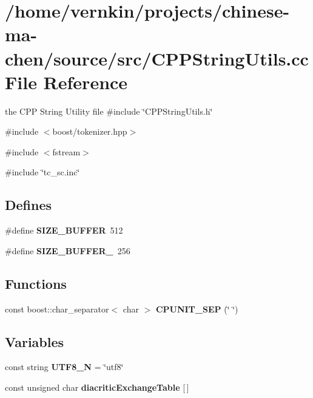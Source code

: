 \section{/home/vernkin/projects/chinese-\/ma-\/chen/source/src/CPPStringUtils.cc File Reference}
\label{CPPStringUtils_8cc}


the CPP String Utility file  
{\ttfamily \#include \char`\"{}CPPStringUtils.h\char`\"{}}\par
{\ttfamily \#include $<$boost/tokenizer.hpp$>$}\par
{\ttfamily \#include $<$fstream$>$}\par
{\ttfamily \#include \char`\"{}tc\_\-sc.inc\char`\"{}}\par
\subsection*{Defines}
\begin{DoxyCompactItemize}
\item 
\#define {\bfseries SIZE\_\-BUFFER}~512\label{CPPStringUtils_8cc_a4dea39042071768c1e115b0ebbfc52f2}

\item 
\#define {\bfseries SIZE\_\-BUFFER\_}~256\label{CPPStringUtils_8cc_aa4577a3eb0be47804f1ec7e20554d163}

\end{DoxyCompactItemize}
\subsection*{Functions}
\begin{DoxyCompactItemize}
\item 
const boost::char\_\-separator$<$ char $>$ {\bfseries CPUNIT\_\-SEP} (\char`\"{} \char`\"{})\label{CPPStringUtils_8cc_a704b52ee55bfc9528ac9a84441848f09}

\end{DoxyCompactItemize}
\subsection*{Variables}
\begin{DoxyCompactItemize}
\item 
const string {\bfseries UTF8\_\-N} = \char`\"{}utf8\char`\"{}\label{CPPStringUtils_8cc_a4b94e31764062d505344847ad696ac2c}

\item 
const unsigned char {\bfseries diacriticExchangeTable} [$\,$]
\end{DoxyCompactItemize}


